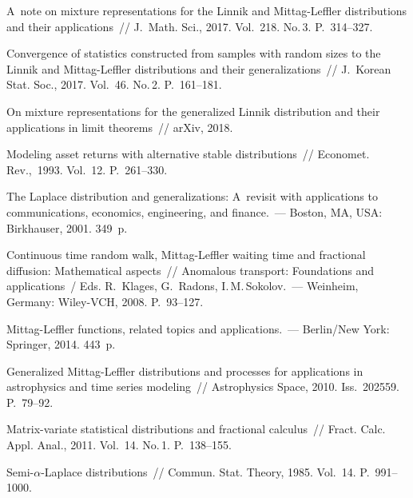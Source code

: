 \begin{multicols}{2}
{{\begin{thebibliography}{99}
 A~note on mixture
representations for the Linnik and Mittag-Leffler distributions and
their applications~// J.~Math. Sci., 2017. Vol.~218. No.\,3. P.~314--327.

 Convergence of statistics
constructed from samples with random sizes to the Linnik and
Mittag-Leffler distributions and their generalizations~// J.~Korean 
Stat. Soc., 2017. Vol.~46. No.\,2. P.~161--181.

On mixture representations for the generalized Linnik distribution and their
applications in limit theorems~// arXiv, 2018.

 Modeling asset returns with
alternative stable distributions~// Economet. Rev.,~1993. Vol.~12. P.~261--330.

 The Laplace
distribution and generalizations: A~revisit with applications to communications, 
economics, engineering, and finance.~--- Boston, MA, USA: Birkhauser, 2001. 349~p.

 Continuous time random walk, Mittag-Leffler 
waiting time and fractional diffusion: Mathematical aspects~// Anomalous transport: 
Foundations and applications~/ Eds. R.~Klages, G.~Radons, I.\,M.\,Sokolov.~--- 
Weinheim, Germany: Wiley-VCH, 2008. P.~93--127.

Mittag-Leffler functions, related topics and applications.~--- 
Berlin/New York: Springer, 2014. 443~p.



 Generalized
Mittag-Leffler distributions and processes for applications in astrophysics and time 
series modeling~// Astrophysics Space, 2010. Iss.~202559. 
P.~79--92.

 Matrix-variate statistical
distributions and fractional calculus~// Fract. Calc.  Appl. Anal., 2011. 
Vol.~14. No.\,1. P.~138--155.

 Semi-$\alpha$-Laplace distributions~//
Commun.  Stat. Theory, 1985. Vol.~14. P.~991--1000.


\end{thebibliography}}}
\end{multicols}
